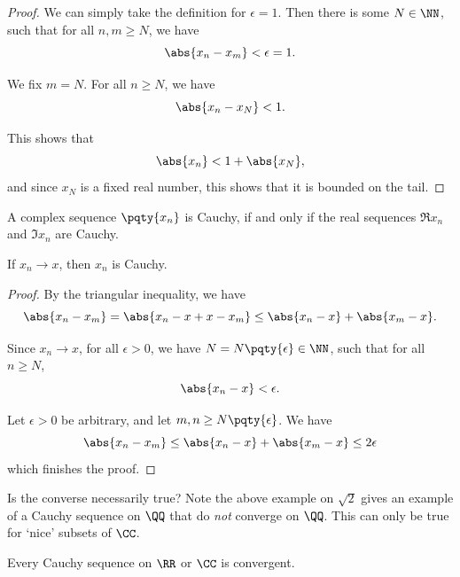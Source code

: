 \begin{proof}
    We can simply take the definition for \(\epsilon = 1\). Then there is some \(N \in \NN\), such that for all \(n, m \geq N\), we have
    \[
        \abs{x_n - x_m} < \epsilon = 1.
    \]

    We fix \(m = N\). For all \(n \geq N\), we have
    \[
        \abs{x_n - x_N} < 1.
    \]

    This shows that
    \[
        \abs{x_n} < 1 + \abs{x_N},
    \]
    and since \(x_N\) is a fixed real number, this shows that it is bounded on the tail.
\end{proof}

\begin{lemma}
    \label{lem:seq-cauchy-complex-real}%
    A complex sequence \(\pqty{x_n}\) is Cauchy, if and only if the real sequences \(\Re x_n\) and \(\Im x_n\) are Cauchy.
\end{lemma}

\begin{lemma}
    \label{lem:seq-convergent-implies-cauchy}%
    If \(x_n \to x\), then \(x_n\) is Cauchy.
\end{lemma}

\begin{proof}
    By the triangular inequality, we have
    \[
        \abs{x_n - x_m} = \abs{x_n - x + x - x_m} \leq \abs{x_n - x} + \abs{x_m - x}.
    \]

    Since \(x_n \to x\), for all \(\epsilon > 0\), we have \(N = N\pqty{\epsilon} \in \NN\), such that for all \(n \geq N\),
    \[
        \abs{x_n - x} < \epsilon.
    \]

    Let \(\epsilon > 0\) be arbitrary, and let \(m, n \geq N\pqty{\epsilon}\). We have
    \[
        \abs{x_n - x_m} \leq \abs{x_n - x} + \abs{x_m - x} \leq 2 \epsilon
    \]
    which finishes the proof.
\end{proof}

Is the converse necessarily true? Note the above example on \(\sqrt{2}\) gives an example of a Cauchy sequence on \(\QQ\) that do \emph{not} converge on \(\QQ\). This can only be true for `nice' subsets of \(\CC\).

\begin{theorem}
    \label{thm:completeness-of-r-and-c}%
    Every Cauchy sequence on \(\RR\) or \(\CC\) is convergent.
\end{theorem}

